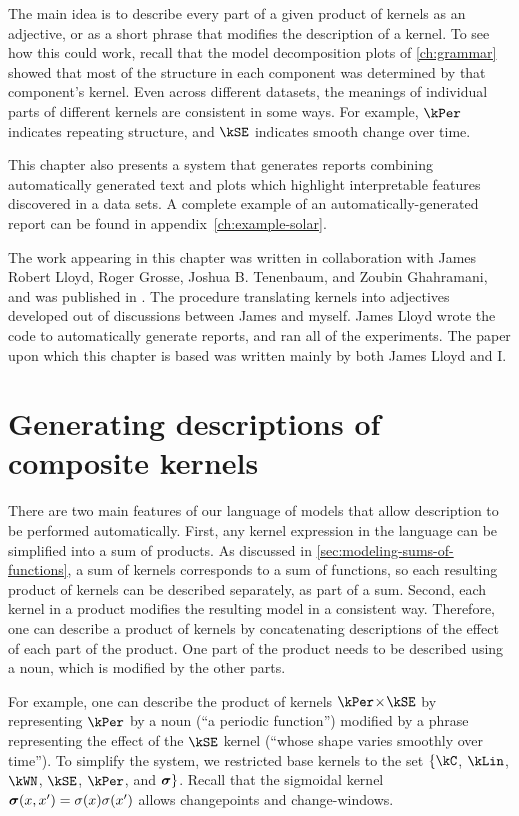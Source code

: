 The main idea is to describe every part of a given product of kernels as an adjective, or as a short phrase that modifies the description of a kernel.
To see how this could work, recall that the model decomposition plots of \cref{ch:grammar} showed that most of the structure in each component was determined by that component's kernel.
Even across different datasets, the meanings of individual parts of different kernels are consistent in some ways.
For example, $\kPer$ indicates repeating structure, and $\kSE$ indicates smooth change over time.

This chapter also presents a system that generates reports combining automatically generated text and plots which highlight interpretable features discovered in a data sets.
A complete example of an automatically-generated report can be found in appendix~\ref{ch:example-solar}.

The work appearing in this chapter was written in collaboration with James Robert Lloyd, Roger Grosse, Joshua B. Tenenbaum, and Zoubin Ghahramani, and was published in \citet{LloDuvGroetal14}.
The procedure translating kernels into adjectives developed out of discussions between James and myself.
James Lloyd wrote the code to automatically generate reports, and ran all of the experiments.
The paper upon which this chapter is based was written mainly by both James Lloyd and I.%


\section{Generating descriptions of composite kernels}

There are two main features of our language of \gp{} models that allow description to be performed automatically.
First, any kernel expression in the language can be simplified into a sum of products.
As discussed in \cref{sec:modeling-sums-of-functions}, a sum of kernels corresponds to a sum of functions, so each resulting product of kernels can be described separately, as part of a sum.
Second, each kernel in a product modifies the resulting model in a consistent way.
Therefore, one can describe a product of kernels by concatenating descriptions of the effect of each part of the product.
One part of the product needs to be described using a noun, which is modified by the other parts.

For example, one can describe the product of kernels $\kPer \kerntimes \kSE$ by representing $\kPer$ by a noun (``a periodic function'') modified by a phrase representing the effect of the $\kSE$ kernel (``whose shape varies smoothly over time'').
To simplify the system, we restricted base kernels to the set $\{\kC$, $\kLin$, $\kWN$, $\kSE$, $\kPer$, and ${\boldsymbol{\sigma}}\}$.
Recall that the sigmoidal kernel ${\boldsymbol{\sigma}}(x, x') = \sigma(x)\sigma(x')$ allows changepoints and change-windows.


